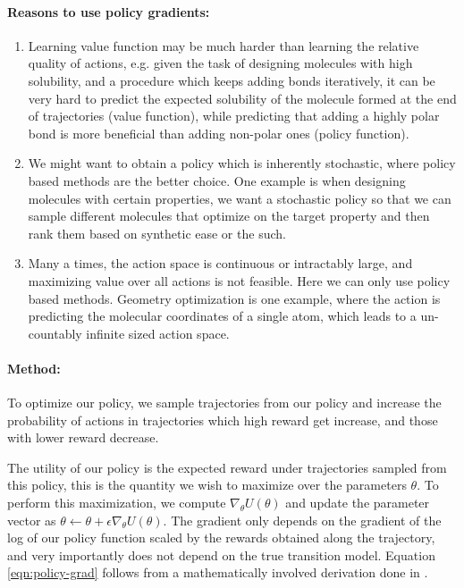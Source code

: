 \paragraph{Reasons to use policy gradients:}
\begin{enumerate}
    \item Learning value function may be much harder than learning the relative quality of actions, e.g. given the task of designing molecules with high solubility, and a procedure which keeps adding bonds iteratively, it can be very hard to predict the expected solubility of the molecule formed at the end of trajectories (value function), while predicting that adding a highly polar bond is more beneficial than adding non-polar ones (policy function).
    \item We might want to obtain a policy which is inherently stochastic, where policy based methods are the better choice. One example is when designing molecules with certain properties, we want a stochastic policy so that we can sample different molecules that optimize on the target property and then rank them based on synthetic ease or the such.
    \item Many a times, the action space is continuous or intractably large, and maximizing value over all actions is not feasible. Here we can only use policy based methods. Geometry optimization is one example, where the action is predicting the molecular coordinates of a single atom, which leads to a un-countably infinite sized action space.
\end{enumerate}

\paragraph{Method:}
To optimize our policy, we sample trajectories from our policy and increase the probability of actions in trajectories which high reward get increase, and those with lower reward decrease.

The utility of our policy is the expected reward under trajectories sampled from this policy, this is the quantity we wish to maximize over the parameters $\theta$. To perform this maximization, we compute $\nabla_\theta U(\theta)$ and update the parameter vector as $\theta \leftarrow \theta + \epsilon \nabla_\theta U(\theta)$. The gradient only depends on the gradient of the log of our policy function scaled by the rewards obtained along the trajectory, and very importantly does not depend on the true transition model. Equation \ref{eqn:policy-grad} follows from a mathematically involved derivation done in \cite{}.


